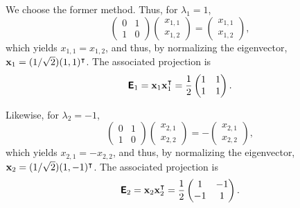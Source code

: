 {We choose the former method.
Thus, for $\lambda_1=1$,
\begin{equation}
\begin{pmatrix}
 0&1\\  1&0
\end{pmatrix}
\begin{pmatrix}
x_{1,1}\\x_{1,2}
\end{pmatrix}
=\begin{pmatrix}
x_{1,1}\\x_{1,2}
\end{pmatrix}
,
\end{equation}
which yields  $x_{1,1}=x_{1,2}$, and thus, by normalizing the eigenvector,
${\bf x}_1=(1/\sqrt{2})(1,1)^\intercal $.
The associated projection is
\begin{equation}
\textsf{\textbf{E}}_1={\bf x}_1{\bf x}_1^\intercal =\frac{1}{2}
\begin{pmatrix}
 1&1\\  1&1
\end{pmatrix}
.
\end{equation}


Likewise, for $\lambda_2=-1$,
\begin{equation}
\begin{pmatrix}
 0&1\\  1&0
\end{pmatrix}
\begin{pmatrix}
x_{2,1}\\x_{2,2}
\end{pmatrix}
=-\begin{pmatrix}
x_{2,1}\\x_{2,2}
\end{pmatrix}
,
\end{equation}
which yields  $x_{2,1}=-x_{2,2}$, and thus, by normalizing the eigenvector,
${\bf x}_2=(1/\sqrt{2})(1,-1)^\intercal $.
The associated projection is
\begin{equation}
\textsf{\textbf{E}}_2={\bf x}_2{\bf x}_2^\intercal =\frac{1}{2}
\begin{pmatrix}
 1&-1\\  -1&1
\end{pmatrix}
.
\end{equation}

}

